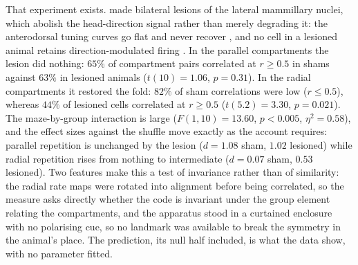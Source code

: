 \documentclass[9pt,lineno]{elife}
\begin{document}
That experiment exists. \citet{harland2017} made bilateral lesions of the lateral mammillary nuclei,
which abolish the head-direction signal rather than merely degrading it: the anterodorsal tuning curves
go flat and never recover \citep{blair1999}, and no cell in a lesioned animal retains
direction-modulated firing \citep{bassett2007}. In the parallel compartments the lesion did nothing:
$65\%$ of compartment pairs correlated at $r \ge 0.5$ in shams against $63\%$ in lesioned animals
($t(10) = 1.06$, $p = 0.31$). In the radial compartments it restored the fold: $82\%$ of sham
correlations were low ($r \le 0.5$), whereas $44\%$ of lesioned cells correlated at $r \ge 0.5$
($t(5.2) = 3.30$, $p = 0.021$). The maze-by-group interaction is large ($F(1,10) = 13.60$, $p < 0.005$,
$\eta^2 = 0.58$), and the effect sizes against the shuffle move exactly as the account requires:
parallel repetition is unchanged by the lesion ($d = 1.08$ sham, $1.02$ lesioned) while radial
repetition rises from nothing to intermediate ($d = 0.07$ sham, $0.53$ lesioned). Two features make this
a test of invariance rather than of similarity: the radial rate maps were rotated into alignment before
being correlated, so the measure asks directly whether the code is invariant under the group element
relating the compartments, and the apparatus stood in a curtained enclosure with no polarising cue, so
no landmark was available to break the symmetry in the animal's place. The prediction, its null half
included, is what the data show, with no parameter fitted.
\end{document}
